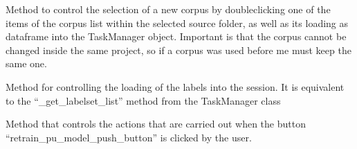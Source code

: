 \documentclass[letterpaper,10pt,english]{sphinxmanual}
\begin{document}
\begin{fulllineitems}
\begin{fulllineitems}
\label{\detokenize{gui_main_window:src.graphical_user_interface.main_window.MainWindow.clicked_load_corpus}}
\sphinxAtStartPar
Method to control the selection of a new corpus by double\sphinxhyphen{}clicking
one of the items of the corpus list within the selected source folder,
as well as its loading as dataframe into the TaskManager object.
Important is that the corpus cannot be changed inside the same project,
so if a corpus was used before me must keep the same one.

\end{fulllineitems}


\begin{fulllineitems}
\label{\detokenize{gui_main_window:src.graphical_user_interface.main_window.MainWindow.clicked_load_labels}}
\sphinxAtStartPar
Method for controlling the loading of the labels into the session.
It is equivalent to the “\_get\_labelset\_list” method from the
TaskManager class

\end{fulllineitems}


\begin{fulllineitems}
\label{\detokenize{gui_main_window:src.graphical_user_interface.main_window.MainWindow.clicked_reevaluate_model}}
\sphinxAtStartPar
Method that controls the actions that are carried out when the button “retrain\_pu\_model\_push\_button” is
clicked by the user.

\end{fulllineitems}



\end{fulllineitems}
\end{document}
